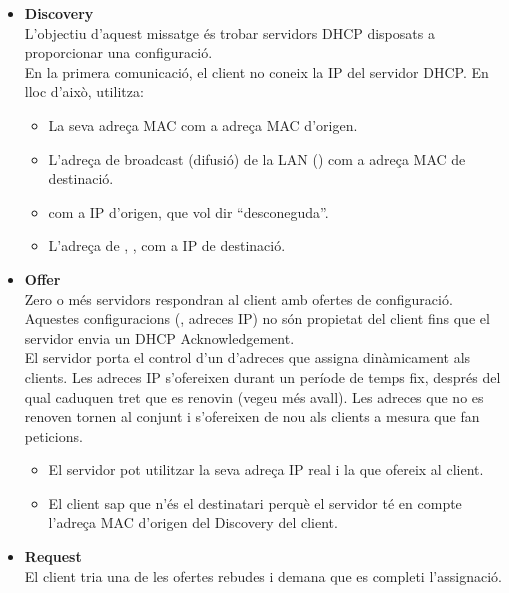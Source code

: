 \begin{itemize}

\item \textbf{Discovery}\\
L'objectiu d'aquest missatge és trobar servidors DHCP disposats a proporcionar
una configuració.\\[-0.3cm]

En la primera comunicació, el client
no coneix la IP del servidor DHCP. En lloc d'això, utilitza:
\begin{itemize}
\item La seva adreça MAC com a adreça MAC d'origen.
\item L'adreça de broadcast (difusió) de la LAN () com a adreça MAC de destinació.
\item {} com a IP d'origen, que vol dir ``desconeguda''.
\item L'adreça de , , com a IP de destinació.
\end{itemize}

\vspace{0.25cm}
\item \textbf{Offer}\\
Zero o més servidors respondran al client amb ofertes de configuració.
Aquestes configuracions (\eg, adreces IP) no són propietat del client
fins que el servidor envia un DHCP Acknowledgement.\\[-0.3cm]

El servidor porta el control d'un  d'adreces que
assigna dinàmicament als clients.
% 
Les adreces IP s'ofereixen durant un període de temps fix, després del qual caduquen
tret que es renovin (vegeu més avall). Les adreces que no es renoven tornen
al conjunt i s'ofereixen de nou als clients a mesura que fan peticions.
\\[-0.3cm]

\begin{itemize}
\item El servidor pot utilitzar la seva adreça IP real i la que ofereix al client.
\item El client sap que n'és el destinatari perquè el servidor té en compte
l'adreça MAC d'origen del Discovery del client.
\end{itemize}

\vspace{0.25cm}
\item \textbf{Request}\\
El client tria una de les ofertes rebudes i demana que
es completi l'assignació.\\[-0.3cm]


\end{itemize}

